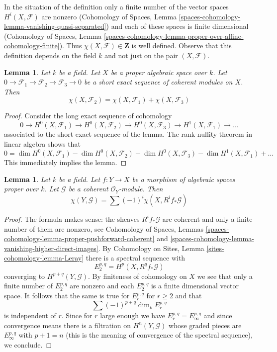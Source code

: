 \documentclass{stacks-project}
\theoremstyle{plain}
\newtheorem{lemma}[subsection]{Lemma}
\theoremstyle{definition}
\theoremstyle{remark}
\numberwithin{equation}{subsection}
\begin{document}
\noindent
In the situation of the definition only a finite number of the vector spaces
$H^i(X, \mathcal{F})$ are nonzero (Cohomology of Spaces, Lemma
\ref{spaces-cohomology-lemma-vanishing-quasi-separated})
and each of these spaces is finite dimensional
(Cohomology of Spaces, Lemma
\ref{spaces-cohomology-lemma-proper-over-affine-cohomology-finite}). Thus
$\chi(X, \mathcal{F}) \in \mathbf{Z}$ is well defined. Observe that
this definition depends on the field $k$ and not just on the pair
$(X, \mathcal{F})$.

\begin{lemma}
\label{lemma-euler-characteristic-additive}
Let $k$ be a field. Let $X$ be a proper algebraic space over $k$.
Let $0 \to \mathcal{F}_1 \to \mathcal{F}_2 \to \mathcal{F}_3 \to 0$
be a short exact sequence of coherent modules on $X$. Then
$$
\chi(X, \mathcal{F}_2) = \chi(X, \mathcal{F}_1) + \chi(X, \mathcal{F}_3)
$$
\end{lemma}

\begin{proof}
Consider the long exact sequence of cohomology
$$
0 \to H^0(X, \mathcal{F}_1) \to H^0(X, \mathcal{F}_2) \to
H^0(X, \mathcal{F}_3) \to H^1(X, \mathcal{F}_1) \to \ldots
$$
associated to the short exact sequence of the lemma. The rank-nullity theorem
in linear algebra shows that
$$
0 = \dim H^0(X, \mathcal{F}_1) - \dim H^0(X, \mathcal{F}_2)
+ \dim H^0(X, \mathcal{F}_3) - \dim H^1(X, \mathcal{F}_1) + \ldots
$$
This immediately implies the lemma.
\end{proof}

\begin{lemma}
\label{lemma-euler-characteristic-morphism}
Let $k$ be a field. Let $f : Y \to X$ be a morphism of
algebraic spaces proper over $k$. Let $\mathcal{G}$ be a
coherent $\mathcal{O}_Y$-module. Then
$$
\chi(Y, \mathcal{G}) = \sum (-1)^i \chi(X, R^if_*\mathcal{G})
$$
\end{lemma}

\begin{proof}
The formula makes sense: the sheaves $R^if_*\mathcal{G}$ are coherent
and only a finite number of them are nonzero, see
Cohomology of Spaces, Lemmas
\ref{spaces-cohomology-lemma-proper-pushforward-coherent} and
\ref{spaces-cohomology-lemma-vanishing-higher-direct-images}.
By Cohomology on Sites, Lemma \ref{sites-cohomology-lemma-Leray}
there is a spectral sequence with
$$
E_2^{p, q} = H^p(X, R^qf_*\mathcal{G})
$$
converging to $H^{p + q}(Y, \mathcal{G})$. By finiteness of cohomology
on $X$ we see that only a finite number of $E_2^{p, q}$ are nonzero
and each $E_2^{p, q}$ is a finite dimensional vector space. It follows
that the same is true for $E_r^{p, q}$ for $r \geq 2$ and that
$$
\sum (-1)^{p + q} \dim_k E_r^{p, q}
$$
is independent of $r$. Since for $r$ large enough we have
$E_r^{p, q} = E_\infty^{p, q}$ and since convergence means there
is a filtration on $H^n(Y, \mathcal{G})$ whose graded pieces are
$E_\infty^{p, q}$ with $p + 1 = n$ (this is the meaning of convergence
of the spectral sequence), we conclude.
\end{proof}
\end{document}
